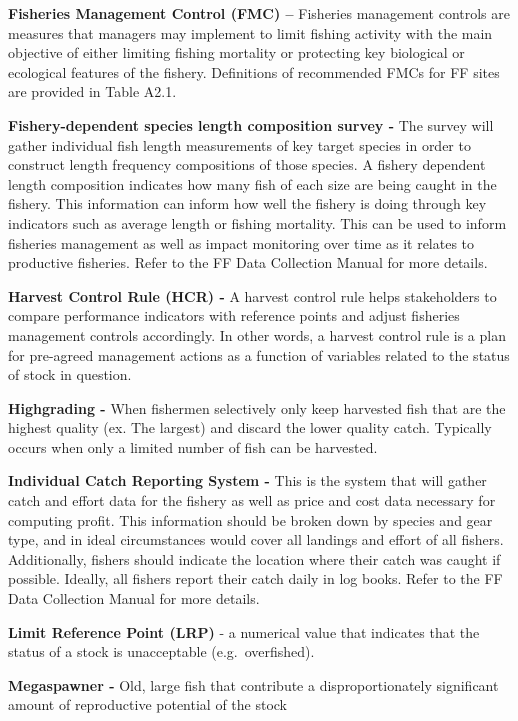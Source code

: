 \documentclass[]{book}
\begin{document}
\textbf{Fisheries Management Control (FMC) --} Fisheries management
controls are measures that managers may implement to limit fishing
activity with the main objective of either limiting fishing mortality or
protecting key biological or ecological features of the fishery.
Definitions of recommended FMCs for FF sites are provided in Table A2.1.

\textbf{Fishery-dependent species length composition survey -} The
survey will gather individual fish length measurements of key target
species in order to construct length frequency compositions of those
species. A fishery dependent length composition indicates how many fish
of each size are being caught in the fishery. This information can
inform how well the fishery is doing through key indicators such as
average length or fishing mortality. This can be used to inform
fisheries management as well as impact monitoring over time as it
relates to productive fisheries. Refer to the FF Data Collection Manual
for more details.

\textbf{Harvest Control Rule (HCR) -} A harvest control rule helps
stakeholders to compare performance indicators with reference points and
adjust fisheries management controls accordingly. In other words, a
harvest control rule is a plan for pre-agreed management actions as a
function of variables related to the status of stock in question.

\textbf{Highgrading -} When fishermen selectively only keep harvested
fish that are the highest quality (ex. The largest) and discard the
lower quality catch. Typically occurs when only a limited number of fish
can be harvested.

\textbf{Individual Catch Reporting System -} This is the system that
will gather catch and effort data for the fishery as well as price and
cost data necessary for computing profit. This information should be
broken down by species and gear type, and in ideal circumstances would
cover all landings and effort of all fishers. Additionally, fishers
should indicate the location where their catch was caught if possible.
Ideally, all fishers report their catch daily in log books. Refer to the
FF Data Collection Manual for more details.

\textbf{Limit Reference Point (LRP)} - a numerical value that indicates
that the status of a stock is unacceptable (e.g.~overfished).

\textbf{Megaspawner -} Old, large fish that contribute a
disproportionately significant amount of reproductive potential of the
stock
\end{document}
